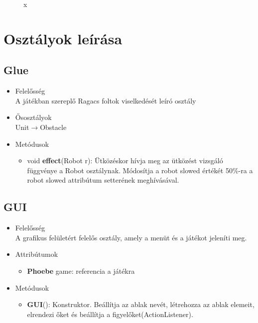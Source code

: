 \begin{figure}[h]
\begin{center}
\caption{x}
\label{fig:example3}
\end{center}
\end{figure}


\section{Osztályok leírása}
\subsection{Glue}
\begin{itemize}
\item Felelősség\\
A játékban szereplő Ragacs foltok viselkedését leíró osztály
\item Ősosztályok\\
Unit$\rightarrow$Obstacle
\item Metódusok
	\begin{itemize}
		\item void \textbf{effect}(Robot r): Ütközéskor hívja meg az ütközést vizsgáló függvénye a Robot osztálynak. Módosítja a robot slowed értékét 50\%-ra a robot slowed attribútum setterének meghívásával.
	\end{itemize}
\end{itemize}

\subsection{GUI}
\begin{itemize}
\item Felelősség\\
A grafikus felületért felelős osztály, amely a menüt és a játékot jeleníti meg.
\item Attribútumok
	\begin{itemize}
		\item \textbf{Phoebe} game: referencia a játékra
	\end{itemize}
\item Metódusok
	\begin{itemize}
		\item\textbf{GUI}(): Konstruktor. Beállítja az ablak nevét, létrehozza az ablak elemeit, elrendezi őket és beállítja a figyelőket(ActionListener).
	\end{itemize}
\end{itemize}

